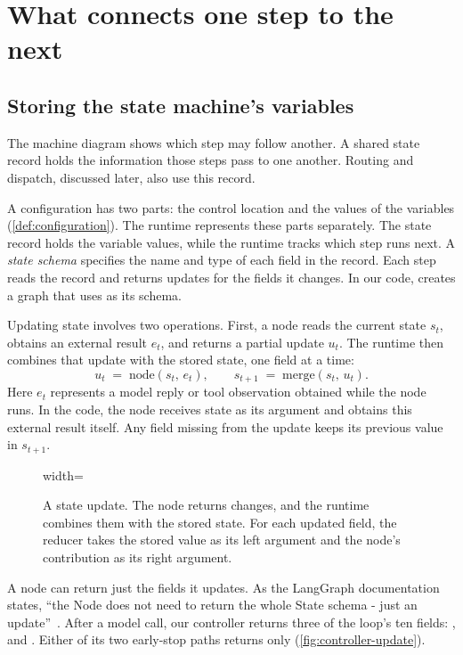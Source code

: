 \section{What connects one step to the next}
\label{sec:state}

\subsection{Storing the state machine's variables}
\label{sec:state-transition}

The machine diagram shows which step may follow another. A shared state record holds the
information those steps pass to one another. Routing and dispatch, discussed later, also use
this record.

A configuration has two parts: the control location and the values of the variables
(\cref{def:configuration}). The runtime represents these parts separately. The state record
holds the variable values, while the runtime tracks which step runs next. A \emph{state schema}
specifies the name and type of each field in the record. Each step reads the record and returns
updates for the fields it changes. In our code,  creates a graph
that uses  as its schema.

Updating state involves two operations. First, a node reads the current state $s_t$, obtains an
external result $e_t$, and returns a partial update $u_t$. The runtime then combines that update
with the stored state, one field at a time:
\[
  u_t \;=\; \mathrm{node}(s_t,\, e_t), \qquad
  s_{t+1} \;=\; \mathrm{merge}(s_t,\, u_t).
\]
Here $e_t$ represents a model reply or tool observation obtained while the node runs. In the
code, the node receives state as its argument and obtains this external result itself. Any field
missing from the update keeps its previous value in $s_{t+1}$.

\begin{figure}[htbp]
  \centering
  \begin{adjustbox}{width=\linewidth}\end{adjustbox}
  \caption{A state update. The node returns changes, and the runtime combines them with the
  stored state. For each updated field, the reducer takes the stored value as its left argument
  and the node's contribution as its right argument.}
  \label{fig:state-transition}
\end{figure}

A node can return just the fields it updates. As the LangGraph documentation states,
``the Node does not need to return the whole State
schema - just an update''~\citep{langgraph-graph-api}. After a model call, our controller returns
three of the loop's ten fields: ,  and .
Either of its two early-stop paths returns only 
(\cref{fig:controller-update}).

